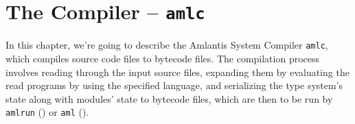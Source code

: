 
\chapter[The Compiler -- amlc]{The Compiler -- \lstinline!amlc!}
\label{ch:tools-amlc}

In this chapter, we're going to describe the Amlantis System Compiler \lstinline!amlc!, which compiles source code files to bytecode files. The compilation process involves reading through the input source files, expanding them by evaluating the read programs by using the specified language, and serializing the type system's state along with modules' state to bytecode files, which are then to be run by \lstinline!amlrun! () or \lstinline!aml! ().






